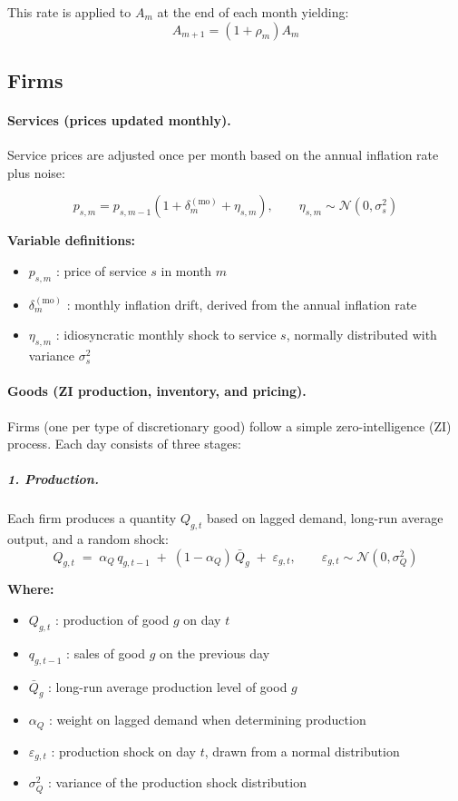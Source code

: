 \documentclass[12pt]{article}
\begin{document}
This rate is applied to $A_m$ at the end of each month yielding:
$$
A_{m+1}=(1+\rho_m)A_m
$$

\subsection*{Firms}

\paragraph{Services (prices updated monthly).}
Service prices are adjusted once per month based on the annual inflation rate plus noise:

$$
p_{s,m} = p_{s,m-1}\left(1+\delta_m^{(\mathrm{mo})}+\eta_{s,m}\right), 
\qquad \eta_{s,m}\sim \mathcal{N}(0,\sigma_s^2)
$$

\textbf{Variable definitions:}
\begin{itemize}
    \item $p_{s,m}$ : price of service $s$ in month $m$
    \item $\delta_m^{(\mathrm{mo})}$ : monthly inflation drift, derived from the annual inflation rate
    \item $\eta_{s,m}$ : idiosyncratic monthly shock to service $s$, normally distributed with variance $\sigma_s^2$
\end{itemize}

\paragraph{Goods (ZI production, inventory, and pricing).}

Firms (one per type of discretionary good) follow a simple zero-intelligence (ZI) process.  
Each day consists of three stages:

\subparagraph{1. Production.}  
Each firm produces a quantity $Q_{g,t}$ based on lagged demand, long-run average output, and a random shock:
$$
Q_{g,t} \;=\; \alpha_Q\, q_{g,t-1} \;+\; (1-\alpha_Q)\,\bar{Q}_g \;+\; \varepsilon_{g,t}, 
\qquad \varepsilon_{g,t} \sim \mathcal{N}(0,\sigma_Q^2)
$$

\textbf{Where:}
\begin{itemize}
    \item $Q_{g,t}$ : production of good $g$ on day $t$
    \item $q_{g,t-1}$ : sales of good $g$ on the previous day
    \item $\bar{Q}_g$ : long-run average production level of good $g$
    \item $\alpha_Q$ : weight on lagged demand when determining production
    \item $\varepsilon_{g,t}$ : production shock on day $t$, drawn from a normal distribution
    \item $\sigma_Q^2$ : variance of the production shock distribution
\end{itemize}
\end{document}
